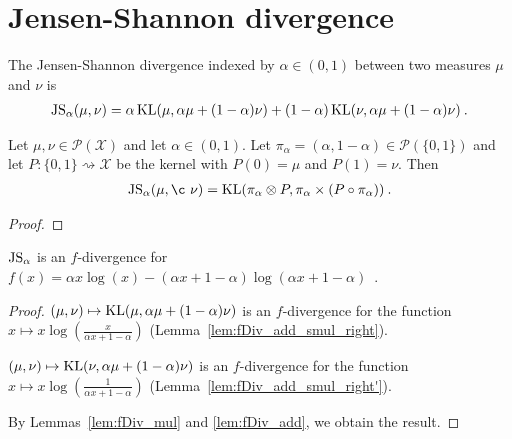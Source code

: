 \section{Jensen-Shannon divergence}

\begin{definition}
  \label{def:jensenShannon}
  The Jensen-Shannon divergence indexed by $\alpha \in (0,1)$ between two measures $\mu$ and $\nu$ is
  \begin{align*}
    \operatorname{JS}_\alpha(\mu, \nu) = \alpha \operatorname{KL}(\mu, \alpha \mu + (1 - \alpha)\nu) + (1 - \alpha) \operatorname{KL}(\nu, \alpha \mu + (1 - \alpha)\nu) \: .
  \end{align*}
\end{definition}


\begin{lemma}
  \label{lem:jensenShannon_eq_kl}
  Let $\mu, \nu \in \mathcal P(\mathcal X)$ and let $\alpha \in (0, 1)$. Let $\pi_\alpha = (\alpha, 1 - \alpha) \in \mathcal P(\{0,1\})$ and let $P : \{0,1\} \rightsquigarrow \mathcal X$ be the kernel with $P(0) = \mu$ and $P(1) = \nu$. Then
  \begin{align*}
  \JS_\alpha(\mu, ¸\nu) = \KL(\pi_\alpha \otimes P, \pi_\alpha \times (P \circ \pi_\alpha)) \: .
  \end{align*}
\end{lemma}

\begin{proof}%
\uses{}

\end{proof}


\begin{lemma}
  \label{lem:jensenShannon_eq_fDiv}
  $\operatorname{JS}_\alpha$ is an $f$-divergence for $f(x) = \alpha x \log(x) - (\alpha x + 1 - \alpha) \log (\alpha x + 1 - \alpha)$~.
\end{lemma}

\begin{proof}%
{}
$(\mu, \nu) \mapsto \operatorname{KL}(\mu, \alpha \mu + (1 - \alpha) \nu)$ is an $f$-divergence for the function $x \mapsto x\log\left(\frac{x}{\alpha x + 1 - \alpha}\right)$ (Lemma~\ref{lem:fDiv_add_smul_right}).

$(\mu, \nu) \mapsto \operatorname{KL}(\nu, \alpha \mu + (1 - \alpha) \nu)$ is an $f$-divergence for the function $x \mapsto x\log\left(\frac{1}{\alpha x + 1 - \alpha}\right)$ (Lemma~\ref{lem:fDiv_add_smul_right'}).

By Lemmas~\ref{lem:fDiv_mul} and \ref{lem:fDiv_add}, we obtain the result.
\end{proof}


